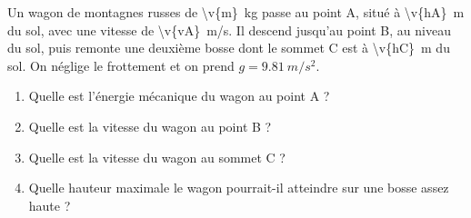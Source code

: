 Un wagon de montagnes russes de \qty{\v{m}}{kg} passe au point A, situé à \qty{\v{hA}}{m} du sol, avec une vitesse de \qty{\v{vA}}{m/s}. Il descend jusqu'au point B, au niveau du sol, puis remonte une deuxième bosse dont le sommet C est à \qty{\v{hC}}{m} du sol. On néglige le frottement et on prend $g = \qty{9.81}{m/s^2}$.

\begin{center}
\end{center}

\begin{enumerate}[label=\alph*)]
    \item Quelle est l'énergie mécanique du wagon au point A ?
    \item Quelle est la vitesse du wagon au point B ?
    \item Quelle est la vitesse du wagon au sommet C ?
    \item Quelle hauteur maximale le wagon pourrait-il atteindre sur une bosse assez haute ?
\end{enumerate}
